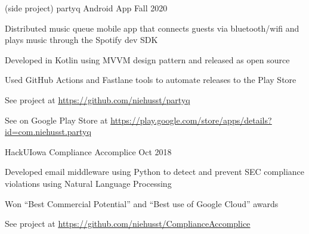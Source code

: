 \documentclass[11pt, a4paper]{awesome-cv}
\begin{document}
\begin{cventries}


  \cventry
    {(side project)}
    {partyq Android App}
    {Fall 2020}
    {}
    {
      \begin{cvitems}
        \item{Distributed music queue mobile app that connects guests via bluetooth/wifi and plays music through the Spotify dev SDK}
        \item{Developed in Kotlin using MVVM design pattern and released as open source}
        \item{Used GitHub Actions and Fastlane tools to automate releases to the Play Store}
        \item{See project at \underline{\href{https://github.com/niehusst/partyq}{https://github.com/niehusst/partyq}}}
        \item{See on Google Play Store at \underline{\href{https://play.google.com/store/apps/details?id=com.niehusst.partyq}{https://play.google.com/store/apps/details?id=com.niehusst.partyq}}}
      \end{cvitems}
    }


    \cventry
	{HackUIowa}
 	{Compliance Accomplice}
	{Oct 2018}
	{}
	{
	  \begin{cvitems}
	     \item{Developed email middleware using Python to detect and prevent SEC compliance violations using Natural Language Processing}
	     \item{Won “Best Commercial Potential” and “Best use of Google Cloud” awards}
	     \item{See project at \underline{\href{https://github.com/niehusst/ComplianceAccomplice}{https://github.com/niehusst/ComplianceAccomplice}}} 
	  \end{cvitems}
	}


\end{cventries}
\end{document}
